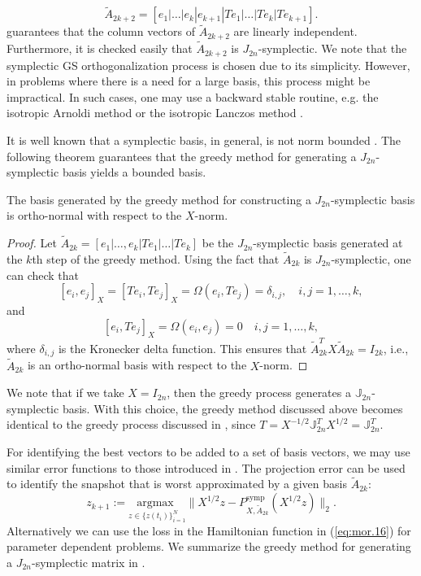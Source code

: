 \begin{equation} \label{eq:normmor.11}
	\tilde A_{2k+2} = [e_1|\dots|e_k|e_{k+1}|Te_1|\dots|Te_k|Te_{k+1}].
\end{equation}
 guarantees that the column vectors of $\tilde A_{2k+2}$ are linearly independent. Furthermore, it is checked easily that $\tilde A_{2k+2}$ is $J_{2n}$-symplectic. We note that the symplectic GS orthogonalization process is chosen due to its simplicity. However, in problems where there is a need for a large basis, this process might be impractical. In such cases, one may use a backward stable routine, e.g. the isotropic Arnoldi method or the isotropic Lanczos method \cite{doi:10.1137/S1064827500366434}.

It is well known that a symplectic basis, in general, is not norm bounded \cite{doi:10.1137/050628519}. The following theorem guarantees that the greedy method for generating a $J_{2n}$-symplectic basis yields a bounded basis.
\begin{theorem} \label{thm:3}
The basis generated by the greedy method for constructing a $J_{2n}$-symplectic basis is ortho-normal with respect to the $X$-norm.
\end{theorem}
\begin{proof}
Let $\tilde A_{2k}=[e_1|\dots,e_k|Te_1|\dots|Te_k]$ be the $J_{2n}$-symplectic basis generated at the $k$th step of the greedy method. Using the fact that $\tilde A_{2k}$ is $J_{2n}$-symplectic, one can check that
\begin{equation} \label{eq:normmor.12}
	[e_i,e_j]_X = [Te_i,Te_j]_X = \Omega(e_i,Te_j)=\delta_{i,j}, \quad i,j=1,\dots,k,	
\end{equation}
and
\begin{equation} \label{eq:normmor.13}
	[e_i,Te_j]_X = \Omega(e_i,e_j) = 0\quad i,j=1,\dots,k,
\end{equation}
where $\delta_{i,j}$ is the Kronecker delta function. This ensures that $\tilde A_{2k}^TX\tilde A_{2k} = I_{2k}$, i.e., $\tilde A_{2k}$ is an ortho-normal basis with respect to the $X$-norm.
\end{proof}
We note that if we take $X=I_{2n}$, then the greedy process generates a $\mathbb J_{2n}$- symplectic basis. With this choice, the greedy method discussed above becomes identical to the greedy process discussed in , since $T = X^{-1/2}\mathbb J_{2n}^TX^{1/2} = \mathbb J_{2n}^T$.

For identifying the best vectors to be added to a set of basis vectors, we may use similar error functions to those introduced in . The projection error can be used to identify the snapshot that is worst approximated by a given basis $\tilde A_{2k}$:
\begin{equation} \label{eq:normmor.14}
	z_{k+1} := \underset{z\in\{ z(t_i)\}_{i=1}^{N}}{\text{argmax } }\| X^{1/2}z - P^\text{symp}_{X,\tilde A_{2k}}(X^{1/2}z) \|_2. 
\end{equation}
Alternatively we can use the loss in the Hamiltonian function in (\ref{eq:mor.16}) for parameter dependent problems. We summarize the greedy method for generating a $J_{2n}$-symplectic matrix in .

